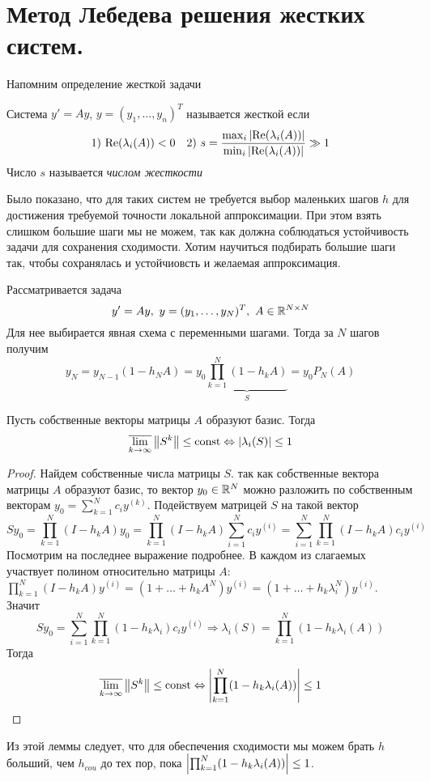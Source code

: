 \section{Метод Лебедева решения жестких систем.}

Напомним определение жесткой задачи
\begin{definition}
  Система $y'=Ay$, $y=(y_1,\ldots,y_n)^T$ называется жесткой
  если
  \[
    1)\ \text{Re}(\lambda_i(A))<0 \quad
    2)\ s = \frac{\max_i\abs{\text{Re}(\lambda_i(A))}}{\min_i\abs{\text{Re}(\lambda_i(A))}}\gg1
  \]
  Число $s$ называется \textit{числом жесткости}
\end{definition}

Было показано, что для таких систем не требуется выбор маленьких шагов $h$
для достижения требуемой точности локальной аппроксимации. При этом
взять слишком большие шаги мы не можем, так как должна соблюдаться устойчивость
задачи для сохранения сходимости. Хотим научиться подбирать большие шаги
так, чтобы сохранялась и устойчиовсть и желаемая аппроксимация.

Рассматривается задача
\[y'=Ay,\ y=(y_1,\ldots,y_N)^T,\ A\in\R^{N\times N}\]
Для нее выбирается явная схема с переменными шагами. Тогда за $N$ шагов
получим
\[y_N=y_{N-1}(1-h_NA)=y_0\underbrace{\prod_{k=1}^N(1-h_kA)}_{S}=y_0P_N(A)\]
\begin{lemma}
  Пусть собственные векторы матрицы $A$ образуют базис. Тогда
  \[\overline{\lim_{k\rightarrow\infty}}\left\lVert S^k\right\rVert\leq\mathrm{const}\Leftrightarrow\left\lvert\lambda_i(S)\right\rvert\leq1\]
\end{lemma}
\begin{proof}
  Найдем собственные числа матрицы $S$. так как собственные вектора матрицы $A$
  образуют базис, то вектор $y_0\in\mathbb{R}^N$ можно разложить по собственным
  векторам $y_0=\sum_{k=1}^Nc_iy^{(k)}$. Подействуем матрицей $S$ на такой вектор
  \[Sy_0=\prod_{k=1}^N(I-h_kA)y_0=\prod_{k=1}^N(I-h_kA)\sum_{i=1}^Nc_iy^{(i)}=\sum_{i=1}^N\prod_{k=1}^N(I-h_kA)c_iy^{(i)}\]
  Посмотрим на последнее выражение подробнее. В каждом из слагаемых
  участвует полином относительно матрицы $A$: $\prod_{k=1}^N(I-h_kA)y^{(i)}=(1+\ldots+h_kA^{N})y^{(i)}=(1+\ldots+h_k\lambda_i^{N})y^{(i)}$. Значит
  \[Sy_0=\sum_{i=1}^N\prod_{k=1}^N(1-h_k\lambda_i)c_iy^{(i)}\Rightarrow\lambda_i(S)=\prod_{k=1}^N(1-h_k\lambda_i(A))\]
  Тогда
  \[\overline{\lim_{k\rightarrow\infty}}\left\lVert S^k\right\rVert\leq\mathrm{const}\Leftrightarrow\left\lvert\prod_{k=1}^N(1-h_k\lambda_i(A))\right\rvert\leq1\]
\end{proof}

Из этой леммы следует, что для обеспечения сходимости мы можем брать $h$
больший, чем $h_{cou}$ до тех пор, пока $\left\lvert\prod_{k=1}^N(1-h_k\lambda_i(A))\right\rvert\leq1$.

